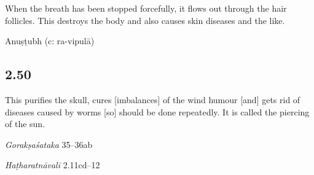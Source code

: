 \begin{ekdosis}
\begin{philcomm}[hp02_049]
\begin{versinnote}
When the breath has been stopped forcefully, it flows out through the hair follicles. This destroys the body and also causes skin diseases and the like.
\end{versinnote}

\begin{versinnote}
%
\end{versinnote}
\end{philcomm}

\begin{metre}[hp02_049]
Anuṣṭubh (c: ra-vipulā)
\end{metre}

\subsection*{2.50}
\begin{translation}[hp02_050]
This purifies the skull, cures [imbalances] of the wind humour [and] gets rid of diseases caused by worms [so] should be done repeatedly. It is called the piercing of the sun.
\end{translation}

\begin{sources}[hp02_050]
\emph{Gorakṣaśataka} 35–36ab

\begin{versinnote}
\end{versinnote}
\end{sources}

\begin{testimonia}[hp02_050]
\emph{Haṭharatnāvalī} 2.11cd–12

\begin{versinnote}
\tl{kapālaṃ ... śanaiḥ ] kapālaśodhanaṃ vātadoṣaghnaṃ kṛmināśanaṃ N,n1,n4.\\+}
\end{versinnote} 


\end{testimonia}
\end{ekdosis}
